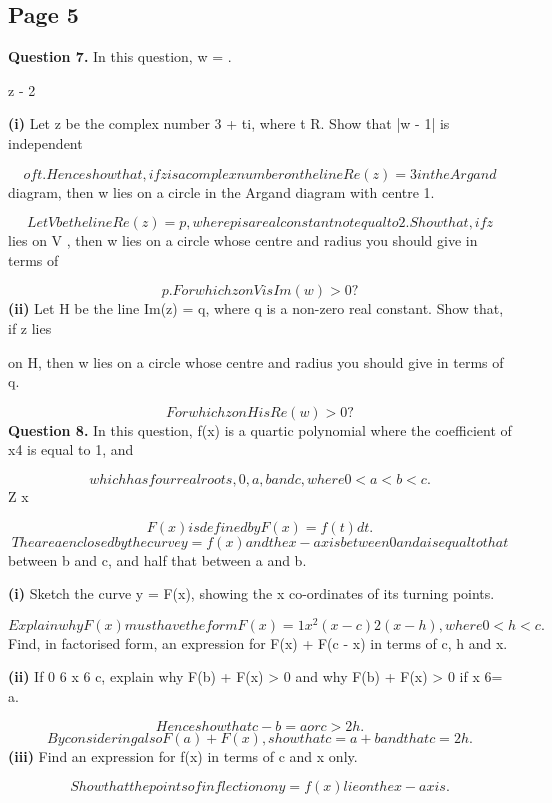 \documentclass[12pt]{article}
\begin{document}
\subsection*{Page 5}
\begin{flushleft}
\bigskip\textbf{Question 7.} In this question, w = .\par
z - 2\par
\textbf{(i)} Let z be the complex number 3 + ti, where t \in R. Show that |w - 1| is independent\par
\[of t. Hence show that, if z is a complex number on the line Re(z) = 3 in the Argand\]
diagram, then w lies on a circle in the Argand diagram with centre 1.\par
\[Let V be the line Re(z) = p, where p is a real constant not equal to 2. Show that, if z\]
lies on V , then w lies on a circle whose centre and radius you should give in terms of\par
\[p. For which z on V is Im(w) > 0?\]
\textbf{(ii)} Let H be the line Im(z) = q, where q is a non-zero real constant. Show that, if z lies\par
on H, then w lies on a circle whose centre and radius you should give in terms of q.\par
\[For which z on H is Re(w) > 0?\]
\bigskip\textbf{Question 8.} In this question, f(x) is a quartic polynomial where the coefficient of x4 is equal to 1, and\par
\[which has four real roots, 0, a, b and c, where 0 < a < b < c.\]
Z x\par
\[F(x) is defined by F(x) = f(t) dt.\]
\[The area enclosed by the curve y = f(x) and the x-axis between 0 and a is equal to that\]
between b and c, and half that between a and b.\par
\textbf{(i)} Sketch the curve y = F(x), showing the x co-ordinates of its turning points.\par
\[Explain why F(x) must have the form F(x) = 1 x^2(x - c)2(x - h), where 0 < h < c.\]
Find, in factorised form, an expression for F(x) + F(c - x) in terms of c, h and x.\par
\textbf{(ii)} If 0 6 x 6 c, explain why F(b) + F(x) > 0 and why F(b) + F(x) > 0 if x 6= a.\par
\[Hence show that c - b = a or c > 2h.\]
\[By considering also F(a) + F(x), show that c = a + b and that c = 2h.\]
\textbf{(iii)} Find an expression for f(x) in terms of c and x only.\par
\[Show that the points of inflection on y = f(x) lie on the x-axis.\]
\end{flushleft}
\end{document}
